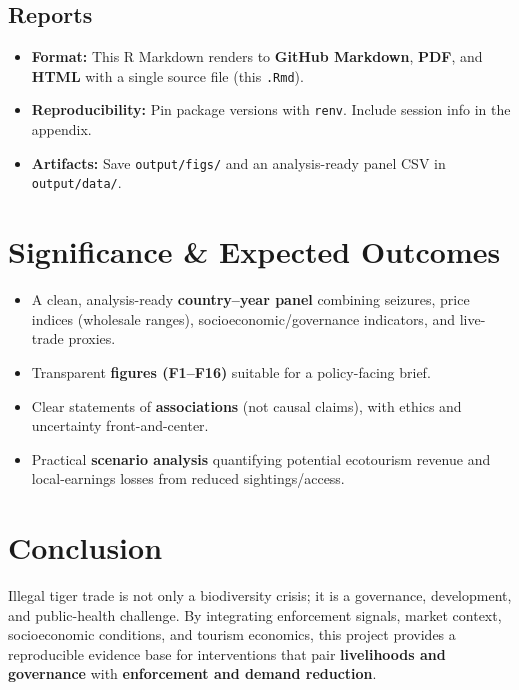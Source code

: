 \documentclass[
]{article}
\providecommand{\tightlist}{%
  \setlength{\itemsep}{0pt}\setlength{\parskip}{0pt}}
\begin{document}
\subsection{Reports}\label{reports}

\begin{itemize}
\tightlist
\item
  \textbf{Format:} This R Markdown renders to \textbf{GitHub Markdown},
  \textbf{PDF}, and \textbf{HTML} with a single source file (this
  \texttt{.Rmd}).
\item
  \textbf{Reproducibility:} Pin package versions with \texttt{renv}.
  Include session info in the appendix.
\item
  \textbf{Artifacts:} Save \texttt{output/figs/} and an analysis-ready
  panel CSV in \texttt{output/data/}.
\end{itemize}

\section{Significance \& Expected
Outcomes}\label{significance-expected-outcomes}

\begin{itemize}
\tightlist
\item
  A clean, analysis-ready \textbf{country--year panel} combining
  seizures, price indices (wholesale ranges), socioeconomic/governance
  indicators, and live-trade proxies.
\item
  Transparent \textbf{figures (F1--F16)} suitable for a policy-facing
  brief.
\item
  Clear statements of \textbf{associations} (not causal claims), with
  ethics and uncertainty front-and-center.
\item
  Practical \textbf{scenario analysis} quantifying potential ecotourism
  revenue and local-earnings losses from reduced sightings/access.
\end{itemize}

\section{Conclusion}\label{conclusion}

Illegal tiger trade is not only a biodiversity crisis; it is a
governance, development, and public-health challenge. By integrating
enforcement signals, market context, socioeconomic conditions, and
tourism economics, this project provides a reproducible evidence base
for interventions that pair \textbf{livelihoods and governance} with
\textbf{enforcement and demand reduction}.
\end{document}
